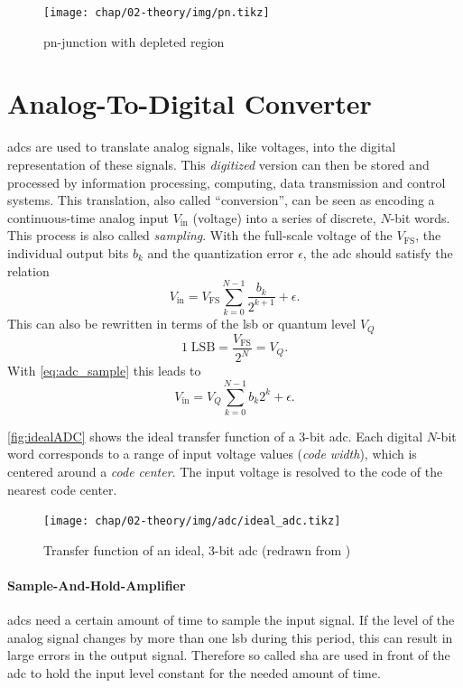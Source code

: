 \begin{figure}[tb]
	\centering
	\texttt{[image: chap/02-theory/img/pn.tikz]}
	\caption{pn-junction with depleted region \cite{pn-junc}}
	\label{fig:pn_junc}
\end{figure}


\section{Analog-To-Digital Converter}
\Glspl{adc} are used to translate analog signals, like voltages, into the digital representation of these signals.
This \textit{digitized} version can then be stored and processed by information processing, computing, data transmission and control systems. 
This translation, also called ``conversion'', can be seen as encoding a continuous-time analog input $V_\text{in}$ (voltage) into a series of discrete, $N$-bit words. %
This process is also called \textit{sampling}. 
With the full-scale voltage of the $V_{\text{FS}}$, the individual output bits $b_k$ and the quantization error $\epsilon$, the \gls{adc} should satisfy the relation
\begin{equation} \label{eq:adc_sample}
	V_{\text{in}} = V_{\text{FS}} \sum_{k = 0}^{N-1} \frac{b_k}{2^{k+1}} + \epsilon.
\end{equation}
This can also be rewritten in terms of the \gls{lsb} or quantum level $V_Q$
\begin{equation}
	1 \; \text{LSB} = \frac{V_\text{FS}}{2^N} = V_Q.
\end{equation}
With \autoref{eq:adc_sample} this leads to 
\begin{equation}
	V_\text{in} = V_Q \sum_{k = 0}^{N-1} b_k 2^{k}  + \epsilon.
\end{equation}

\autoref{fig:idealADC} shows the ideal transfer function of a 3-bit \gls{adc}. 
Each digital $N$-bit word corresponds to a range of input voltage values (\textit{code width}), which is centered around a \textit{code center}.
The input voltage is resolved to the code of the nearest code center.
\begin{figure}[H]
	\centering
	\texttt{[image: chap/02-theory/img/adc/ideal\_adc.tikz]}
	\caption[Transfer function of ideal, 3-bit ADC]{Transfer function of an ideal, 3-bit \gls{adc} (redrawn from \cite{Lundberg})}
	\label{fig:idealADC}
\end{figure}


\paragraph{Sample-And-Hold-Amplifier}
\Glspl{adc} need a certain amount of time to sample the input signal.
If the level of the analog signal changes by more than one \gls{lsb} during this period, this can result in large errors in the output signal.
Therefore so called \gls{sha} are used in front of the \gls{adc} to hold the input level constant for the needed amount of time.

